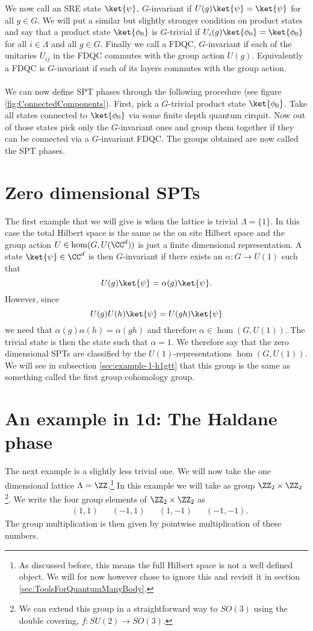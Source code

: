 We now call an SRE state $\ket{\psi}$, $G$-invariant if $U(g)\ket{\psi}=\ket{\psi}$ for all $g\in G$. We will put a similar but slightly stronger condition on product states and say that a product state $\ket{\phi_0}$ is $G$-trivial if $U_i(g)\ket{\phi_0}=\ket{\phi_0}$ for all $i\in\Lambda$ and all $g\in G$. Finally we call a FDQC, $G$-invariant if each of the unitaries $U_{ij}$ in the FDQC commutes with the group action $U(g)$. Equivalently a FDQC is $G$-invariant if each of its layers commutes with the group action.\\\\
We can now define SPT phases through the following procedure (see figure \ref{fig:ConnectedComponents}). First, pick a $G$-trivial product state $\ket{\phi_0}$. Take all states connected to $\ket{\phi_0}$ via some finite depth quantum cirquit. Now out of those states pick only the $G$-invariant ones and group them together if they can be connected via a $G$-invariant FDQC. The groups obtained are now called the SPT phases.
\section{Zero dimensional SPTs}\label{sec:zero-dimensional-spts}The first example that we will give is when the lattice is trivial $\Lambda=\{1\}$. In this case the total Hilbert space is the same as the on site Hilbert space and the group action $U\in\hom(G,U(\CC^d))$ is just a finite dimensional representation. A state $\ket{\psi}\in\CC^d$ is then $G$-invariant if there exists an $\alpha:G\rightarrow U(1)$ such that
\begin{equation}
	U(g)\ket{\psi}=\alpha(g)\ket{\psi}.
\end{equation}
However, since
\begin{equation}
	U(g)U(h)\ket{\psi}=U(gh)\ket{\psi}
\end{equation}
we need that $\alpha(g)\alpha(h)=\alpha(gh)$ and therefore $\alpha\in\hom(G,U(1))$. The trivial state is then the state such that $\alpha=1$. We therefore say that the zero dimensional SPTs are classified by the $U(1)$-representations $\hom(G,U(1))$. We will see in subsection \ref{sec:example-1-h1gtt} that this group is the same as something called the first group cohomology group.
\section{An example in 1d: The Haldane phase}
The next example is a slightly less trivial one. We will now take the one dimensional lattice $\Lambda=\ZZ$.\footnote{As discussed before, this means the full Hilbert space is not a well defined object. We will for now however chose to ignore this and revisit it in section \ref{sec:ToolsForQuantumManyBody}.} In this example we will take as group $\ZZ_2\times\ZZ_2$\footnote{We can extend this group in a straightforward way to $SO(3)$ using the double covering, $f:SU(2)\rightarrow SO(3)$.}. We write the four group elements of $\ZZ_2\times\ZZ_2$ as
\begin{align}
	&(1,1)&&(-1,1)&&(1,-1)&&(-1,-1).
\end{align}
The group multiplication is then given by pointwise multiplication of these numbers.
